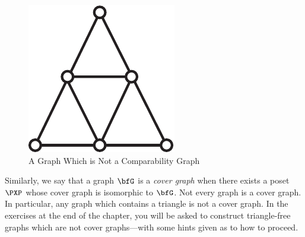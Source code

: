 \begin{figure}
\begin{center}
\includegraphics*[scale=.4]{posets-figs/noncompgraph.pdf}
\caption{\label{fig:noncompgraph}\sc A Graph Which is Not a Comparability Graph}
\end{center}
\end{figure}

Similarly, we say that a graph $\bfG$ is a \emph{cover graph} when there
exists a poset $\PXP$ whose cover graph is isomorphic to $\bfG$.  Not
every graph is a cover graph.  In particular, any graph which contains
a triangle is not a cover graph.  In the exercises at the end of the
chapter, you will be asked to construct triangle-free graphs which are
not cover graphs---with some hints given as to how to proceed.

